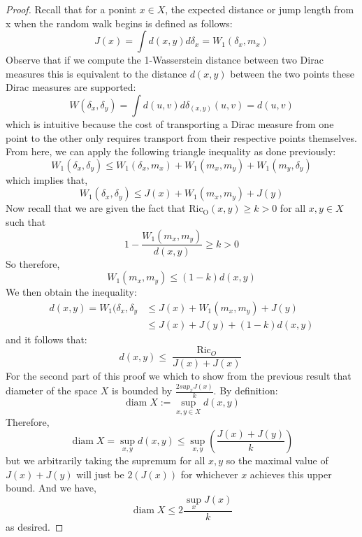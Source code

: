 \documentclass[10pt,a4paper]{amsart}
\begin{document}
\begin{proof}
Recall that for a ponint $x \in X$, the expected distance or jump length from x when the random walk begins is defined as follows:
$$
J(x) = \int d(x,y) d \delta_x = W_1(\delta_x, m_x)
$$
Observe that if we compute the 1-Wasserstein distance between two Dirac measures this is equivalent to the distance $d(x,y)$ between the two points these Dirac measures are supported: 
$$
W(\delta_x, \delta_y) = \int d(u,v) d \delta_{(x,y)}(u,v) = d(u,v)
$$
which is intuitive because the cost of transporting a Dirac measure from one point to the other only requires transport from their respective points themselves. From here, we can apply the following triangle inequality as done previously: 
$$
W_1(\delta_x, \delta_y) \leq W_1(\delta_x, m_x) + W_1(m_x, m_y) + W_1(m_y, \delta_y)
$$
which implies that, 
$$
W_1(\delta_x, \delta_y) \leq J(x) + W_1(m_x, m_y) + J(y)
$$
Now recall that we are given the fact that $\operatorname{Ric_O}(x, y) \geq k >0$ for all $x, y \in X$ such that 
$$
1 - \frac{W_1 (m_x, m_y)}{d(x,y)} \geq k >0
$$
So therefore, 
$$
W_1(m_x, m_y) \leq (1-k)d(x,y)
$$
We then obtain the inequality:
\begin{align*}
d(x,y) = W_1(\delta_x, \delta_y &\leq J(x) + W_1(m_x, m_y) + J(y)  \\ &\leq J(x) + J(y) + (1-k)d(x,y)
\end{align*}
and it follows that: 
$$
d(x,y) \leq \frac{\operatorname{Ric}_O}{J(x) + J(x)}
$$
For the second part of this proof we which to show from the previous result that diameter of the space $X$ is bounded by $\frac{2sup_x J(x)}{k}$. By definition: 
$$
\operatorname{diam}X := \operatorname{sup}_{x,y \in X} d(x,y)
$$
Therefore, 
$$
\operatorname{diam} X = \sup_{x, y} d(x, y)
\leq \sup_{x, y} \left( \frac{J(x) + J(y)}{k} \right)
$$
but we arbitrarily taking the supremum for all $x,y$ so the maximal value of $J(x) + J(y)$ will just be $2(J(x))$ for whichever $x$ achieves this upper bound. And we have, 
$$
\operatorname{diam} X \leq 2 \frac{\operatorname{sup}_x J(x)}{k}
$$
as desired. 
\end{proof}
\end{document}
